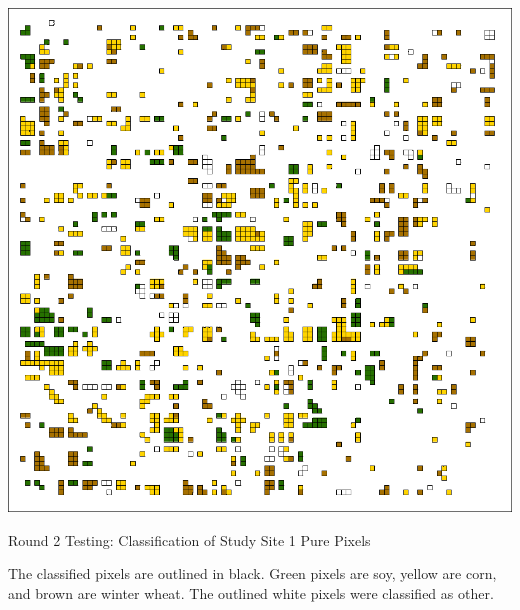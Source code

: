 \begin{ssfigure}
  \centering
  \includegraphics[width=\textwidth]{Graphics/Testing/clip1_MODIS_round2.pdf}
  \caption{Round 2 Testing: Classification of Study Site 1 Pure Pixels}
  \label{fig:ss1r2class}
  \medskip
  \small
  The classified pixels are outlined in black. Green pixels are soy, yellow are corn, and brown are winter wheat. The outlined white pixels were classified as other.
\end{ssfigure}


